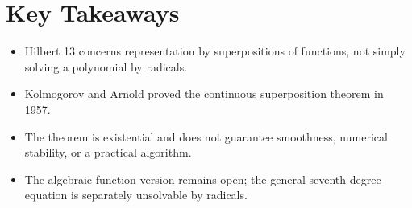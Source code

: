 \section{Key Takeaways}

\begin{itemize}
    \item Hilbert 13 concerns representation by superpositions of functions, not simply solving a polynomial by radicals.
    \item Kolmogorov and Arnold proved the continuous superposition theorem in 1957.
    \item The theorem is existential and does not guarantee smoothness, numerical stability, or a practical algorithm.
    \item The algebraic-function version remains open; the general seventh-degree equation is separately unsolvable by radicals.
\end{itemize}
